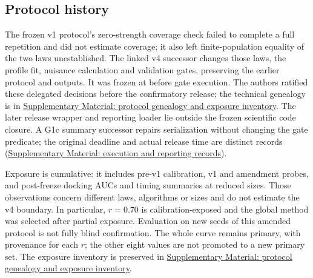 \subsection{Protocol history}

The frozen v1 protocol's zero-strength coverage check failed to complete a full repetition and did not estimate coverage; it also left finite-population equality of the two laws unestablished. The linked v4 successor changes those laws, the profile fit, nuisance calculation and validation gates, preserving the earlier protocol and outputs. It was frozen at  before gate execution. The authors ratified these delegated decisions before the confirmatory release; the technical genealogy is in \hyperref[supp:protocol-lineage]{Supplementary Material: protocol genealogy and exposure inventory}. %
The later release wrapper and reporting loader lie outside the frozen scientific code closure. A G1c summary successor repairs serialization without changing the gate predicate; the original deadline and actual release time are distinct records (\hyperref[supp:execution-records]{Supplementary Material: execution and reporting records}). %

Exposure is cumulative: it includes pre-v1 calibration, v1 and amendment probes, and post-freeze docking AUCs and timing summaries at reduced sizes. Those observations concern different laws, algorithms or sizes and do not estimate the v4 boundary. In particular, $r=0.70$ is calibration-exposed and the global method was selected after partial exposure. Evaluation on new seeds of this amended protocol is not fully blind confirmation. The whole curve remains primary, with provenance for each $r$; the other eight values are not promoted to a new primary set. The exposure inventory is preserved in \hyperref[supp:protocol-lineage]{Supplementary Material: protocol genealogy and exposure inventory}. %
